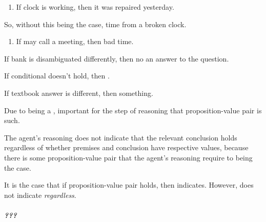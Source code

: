 \begin{note}
  \begin{enumerate}
  \item If clock is working, then it was repaired yesterday.
  \end{enumerate}
  So, without this being the case, time from a broken clock.

  \begin{enumerate}
  \item If may call a meeting, then bad time.
  \end{enumerate}

  If bank is disambiguated differently, then no an answer to the question.

  If conditional doesn't hold, then \mistaken{}.

  If textbook answer is different, then something.
\end{note}

\begin{note}
  Due to being a \requ{}, important for the step of reasoning that proposition-value pair is such.


  The agent's reasoning does not indicate that the relevant conclusion holds regardless of whether premises and conclusion have respective values, because there is some proposition-value pair that the agent's reasoning require to being the case.

  It is the case that if proposition-value pair holds, then indicates.
  However, does not indicate \emph{regardless}.
\end{note}

\subparagraph{???}

